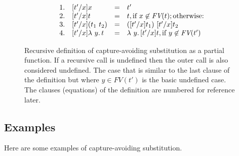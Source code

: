 \begin{figure}
\large
\[
  \begin{array}{llll}
1. &    [t'/x]x & = & t' \\
2. &    [t'/x]t & = & t, \textnormal{if }x\not\in\textit{FV}(t); \textnormal{otherwise:} \\
3. &    [t'/x](t_1\ t_2) & = & ([t'/x] t_1)\ [t'/x]t_2 \\
4. &    [t'/x]\lambda\ y.\, t & = & \lambda\ y.\, [t'/x]t, \textnormal{if } y \not\in\textit{FV}(t')
  \end{array}
\]
  \caption{Recursive definition of capture-avoiding substitution as a
    partial function.  If a recursive call is undefined then the outer
    call is also considered undefined.  The case that is similar to
    the last clause of the definition but where $y\in\textit{FV}(t')$
    is the basic undefined case.  The clauses (equations) of the definition are numbered for reference later.}
  \label{fig:subst}
  \end{figure}

\subsection{Examples}

Here are some examples of capture-avoiding substitution.

